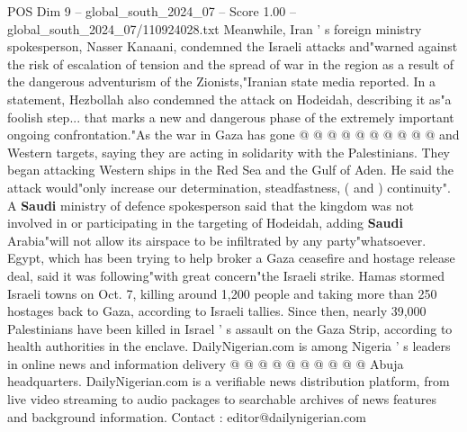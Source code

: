 \begin{textsample}{POS Dim 9 – global\_south\_2024\_07 – Score 1.00 – global\_south\_2024\_07/110924028.txt}
Meanwhile, Iran ' s foreign ministry spokesperson, Nasser Kanaani, condemned the Israeli attacks and"warned against the risk of escalation of tension and the spread of war in the region as a result of the dangerous adventurism of the Zionists,"Iranian state media reported.
In a statement, Hezbollah also condemned the attack on Hodeidah, describing it as"a foolish step... that marks a new and dangerous phase of the extremely important ongoing confrontation."As the war in Gaza has gone @ @ @ @ @ @ @ @ @ @ and Western targets, saying they are acting in solidarity with the Palestinians.
They began attacking Western ships in the Red Sea and the Gulf of Aden.
He said the attack would"only increase our determination, steadfastness, ( and ) continuity".
A \textbf{Saudi} ministry of defence spokesperson said that the kingdom was not involved in or participating in the targeting of Hodeidah, adding \textbf{Saudi} Arabia"will not allow its airspace to be infiltrated by any party"whatsoever.
Egypt, which has been trying to help broker a Gaza ceasefire and hostage release deal, said it was following"with great concern"the Israeli strike.
Hamas stormed Israeli towns on Oct. 7, killing around 1,200 people and taking more than 250 hostages back to Gaza, according to Israeli tallies.
Since then, nearly 39,000 Palestinians have been killed in Israel ' s assault on the Gaza Strip, according to health authorities in the enclave.
DailyNigerian.com is among Nigeria ' s leaders in online news and information delivery @ @ @ @ @ @ @ @ @ @ Abuja headquarters.
DailyNigerian.com is a verifiable news distribution platform, from live video streaming to audio packages to searchable archives of news features and background information.
Contact : editor@dailynigerian.com

\end{textsample}

